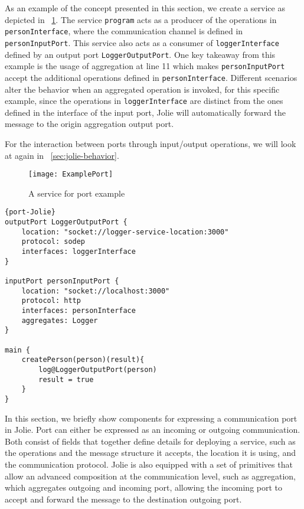 \FloatBarrier

As an example of the concept presented in this section, we create a service as depicted in ~\ref{list:example-port-graphic}.
The service \texttt{program} acts as a producer of the operations in \texttt{personInterface}, where the communication channel is defined in \texttt{personInputPort}.
This service also acts as a consumer of \texttt{loggerInterface} defined by an output port \texttt{LoggerOutputPort}.
One key takeaway from this example is the usage of aggregation at line 11 which makes \texttt{personInputPort} accept the additional operations defined in \texttt{personInterface}. Different scenarios alter the behavior when an aggregated operation is invoked, for this specific example, since the operations in \texttt{loggerInterface} are distinct from the ones defined in the interface of the input port, Jolie will automatically forward the message to the origin aggregation output port.

For the interaction between ports through input/output operations, we will look at again in ~\ref{sec:jolie-behavior}.

\begin{figure}[ht]
    \texttt{[image: ExamplePort]}
    \centering
    \caption{A service for port example}
    \label{list:example-port-graphic}
\end{figure}

\begin{listing}[ht]

    \lstset{language=Jolie,
        style=codeStyle,
        numbers=left,
        firstnumber=1
    }
    \begin{lstlisting}[frame=tlrb, caption= {Jolie Port declaration example}, label={list:example-port} ]{port-Jolie}
outputPort LoggerOutputPort {
    location: "socket://logger-service-location:3000"
    protocol: sodep
    interfaces: loggerInterface
}

inputPort personInputPort {
    location: "socket://localhost:3000"
    protocol: http
    interfaces: personInterface
    aggregates: Logger
}

main {
    createPerson(person)(result){
        log@LoggerOutputPort(person)
        result = true
    }
}
\end{lstlisting}
\end{listing}

In this section, we briefly show components for expressing a communication port in Jolie. Port can either be expressed as an incoming or outgoing communication. Both consist of fields that together define details for deploying a service, such as the operations and the message structure it accepts, the location it is using, and the communication protocol. Jolie is also equipped with a set of primitives that allow an advanced composition at the communication level, such as aggregation, which aggregates outgoing and incoming port, allowing the incoming port to accept and forward the message to the destination outgoing port.

\FloatBarrier
